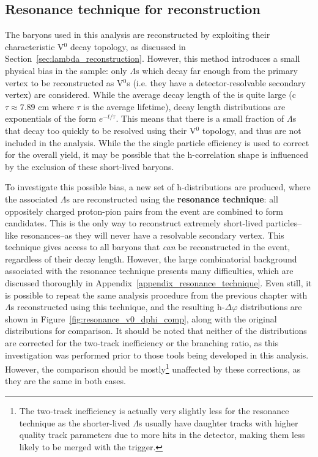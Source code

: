 \subsection{Resonance technique for \lmb reconstruction}
\label{sec:resonance_technique}

The \lmb baryons used in this analysis are reconstructed by exploiting their characteristic V$^0$ decay topology, as discussed in Section~\ref{sec:lambda_reconstruction}. However, this method introduces a small physical bias in the \lmb sample: only $\Lambda$s which decay far enough from the primary vertex to be reconstructed as V$^0$s (i.e. they have a detector-resolvable secondary vertex) are considered. While the average decay length of the \lmb is quite large (c$\tau \approx 7.89$ cm where $\tau$ is the average lifetime), decay length distributions are exponentials of the form $e^{-t/\tau}$. This means that there is a small fraction of $\Lambda$s that decay too quickly to be resolved using their V$^0$ topology, and thus are not included in the analysis. While the the single particle \lmb efficiency is used to correct for the overall \lmb yield, it may be possible that the h-\lmb correlation shape is influenced by the exclusion of these short-lived \lmb baryons. 

To investigate this possible bias, a new set of h-\lmb distributions are produced, where the associated $\Lambda$s are reconstructed using the \textbf{resonance technique}: all oppositely charged proton-pion pairs from the event are combined to form \lmb candidates. This is the only way to reconstruct extremely short-lived particles--like resonances--as they will never have a resolvable secondary vertex.  This technique gives access to all \lmb baryons that \textit{can} be reconstructed in the event, regardless of their decay length. However, the large combinatorial background associated with the resonance technique presents many difficulties, which are discussed thoroughly in Appendix~\ref{appendix_resonance_technique}. Even still, it is possible to repeat the same analysis procedure from the previous chapter with $\Lambda$s reconstructed using this technique, and the resulting h-\lmb $\Delta\varphi$ distributions are shown in Figure~\ref{fig:resonance_v0_dphi_comp}, along with the original distributions for comparison. It should be noted that neither of the distributions are corrected for the two-track inefficiency or the branching ratio, as this investigation was performed prior to those tools being developed in this analysis. However, the comparison should be mostly\footnote{The two-track inefficiency is actually very slightly less for the resonance technique as the shorter-lived $\Lambda$s usually have daughter tracks with higher quality track parameters due to more hits in the detector, making them less likely to be merged with the trigger.} unaffected by these corrections, as they are the same in both cases.

